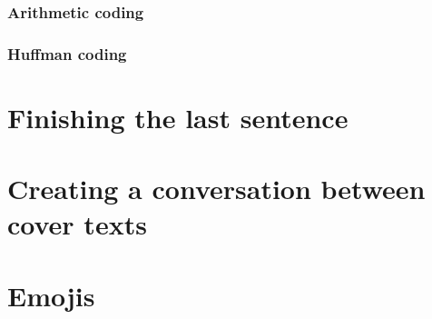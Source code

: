 \subsubsection{Arithmetic coding}
\label{sec:arithmeticCoding}

\subsubsection{Huffman coding}
\label{sec:huffmanCoding}

\section{Finishing the last sentence}
\label{sec:finishingTheLastSentence}

\section{Creating a conversation between cover texts}
\label{sec:creatingAConversationBetweenCoverTexts}

\section{Emojis}
\label{sec:emojis}
